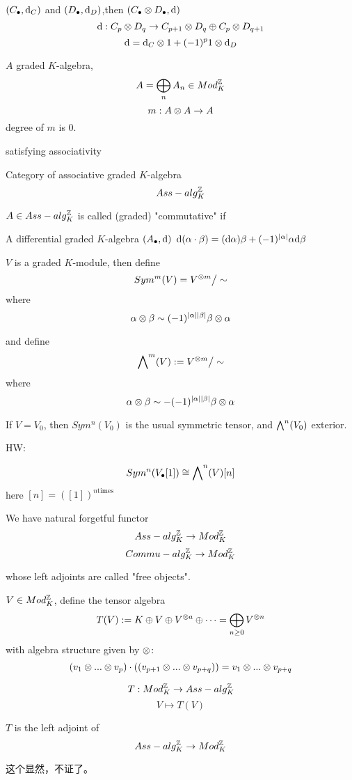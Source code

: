 $(C_{\bullet},\mathrm{d}_C)$ and $(D_{\bullet},\mathrm{d}_D)$,then
$(C_{\bullet} \otimes D_{\bullet},\mathrm{d})$
$$\mathrm{d}:C_p\otimes D_q\to C_{p+1}\otimes D_q\oplus C_p\otimes D_{q+1}$$
$$\mathrm{d}=\mathrm{d}_C\otimes 1+(-1)^p1\otimes \mathrm{d}_D$$

$A$ graded $K$-algebra,
$$A=\bigoplus_nA_n\in Mod_K^{\mathbb{Z}}$$
$$m:A\otimes A\to A$$
degree of $m$ is $0$.

satisfying associativity

Category of associative graded $K$-algebra
$$Ass-alg_K^{\mathbb{Z}}$$

$A\in Ass-alg_K^{\mathbb{Z}}$ is called (graded) "commutative"
if


A differential graded $K$-algebra $(A_{\bullet},\mathrm{d})$
$\mathrm{d}(\alpha\cdot\beta)=(\mathrm{d}\alpha)\beta+(-1)^{|\alpha|}\alpha\mathrm{d}\beta$


$V$ is a graded $K$-module, then define
$$Sym^m(V)=V^{\otimes m}\big/\sim$$
where
$$\alpha\otimes\beta\sim(-1)^{|\alpha||\beta|}\beta\otimes\alpha$$

and define
$$\bigwedge\nolimits^{m}(V):=V^{\otimes m}\big/\sim$$
where
$$\alpha\otimes\beta\sim-(-1)^{|\alpha||\beta|}\beta\otimes\alpha$$

If $V=V_0$, then $Sym^n(V_0)$ is the usual symmetric tensor,
and $\bigwedge\nolimits^{n}(V_0)$ exterior.

HW:%

$$Sym^n(V_{\bullet}[1])\cong\bigwedge\nolimits^{n}(V)[n]$$
here $[n]=([1])^{n\text{times}}$


We have natural forgetful functor
$$Ass-alg_K^{\mathbb{Z}}\to Mod_K^{\mathbb{Z}}$$
$$Commu-alg_K^{\mathbb{Z}}\to Mod_K^{\mathbb{Z}}$$

whose left adjoints are called "free objects".

\begin{definition}
 $V\in Mod_K^{\mathbb{Z}}$, define the tensor algebra
$$T(V):=K\oplus V\oplus V^{\otimes a}\oplus\cdots=\bigoplus_{n\geq 0}V^{\otimes n}$$
with algebra structure given by $\otimes$:
$$(v_1\otimes...\otimes v_p)\cdot((v_{p+1}\otimes...\otimes v_{p+q}))
=v_1\otimes...\otimes v_{p+q}$$
\end{definition}

$$T:Mod_K^{\mathbb{Z}}\to Ass-alg_K^{\mathbb{Z}}$$
$$V\mapsto T(V)$$

\begin{prop}
$T$ is the left adjoint of
$$Ass-alg_K^{\mathbb{Z}}\to Mod_K^{\mathbb{Z}}$$
\end{prop}
这个显然，不证了。

